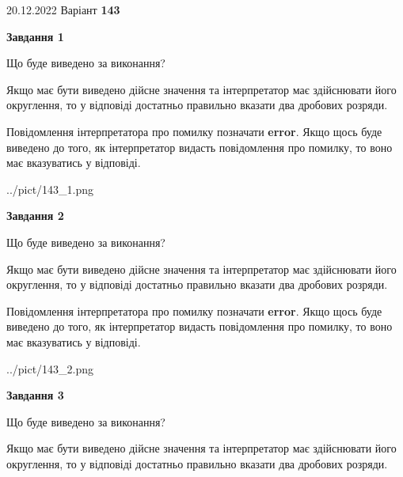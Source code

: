 \documentclass[12pt, ukrainian]{article}
\begin{document}
{20.12.2022 Варіант \No \textbf { 143 }\par}
{
\begin {Large}

{\begin {center}\textbf{Завдання 1}\end {center}}\par
Що буде виведено за виконання? \par

Якщо має бути виведено дійсне значення та інтерпретатор має здійснювати його округлення, 
то у відповіді достатньо правильно вказати два дробових розряди.

Повідомлення інтерпретатора про помилку позначати \textbf{error}.
Якщо щось буде виведено до того, як інтерпретатор видасть повідомлення про помилку, 
то воно має вказуватись у відповіді. \par

\begin{center}
	{../pict/143_1.png}
\end{center}
\newpage

{\begin {center}\textbf{Завдання 2}\end {center}}\par
Що буде виведено за виконання? \par

Якщо має бути виведено дійсне значення та інтерпретатор має здійснювати його округлення, 
то у відповіді достатньо правильно вказати два дробових розряди.

Повідомлення інтерпретатора про помилку позначати \textbf{error}.
Якщо щось буде виведено до того, як інтерпретатор видасть повідомлення про помилку, 
то воно має вказуватись у відповіді. \par

\begin{center}
	{../pict/143_2.png}
\end{center}
\newpage

{\begin {center}\textbf{Завдання 3}\end {center}}\par
Що буде виведено за виконання? \par

Якщо має бути виведено дійсне значення та інтерпретатор має здійснювати його округлення, 
то у відповіді достатньо правильно вказати два дробових розряди.


\end{Large}}
\end{document}
